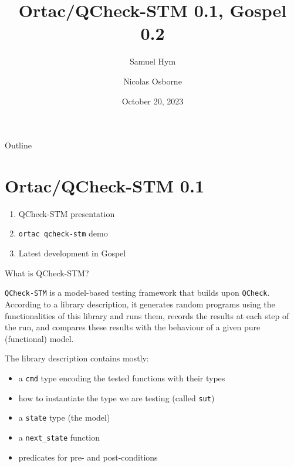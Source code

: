 \documentclass[pdf]{beamer}
\title{Ortac/QCheck-STM 0.1, Gospel 0.2}
\author{
  Samuel Hym
  \and
  Nicolas Osborne
}
\date{October 20, 2023}
\begin{document}
\begin{frame}
  \titlepage
\end{frame}

\begin{frame}{Outline}
    \tableofcontents[hideallsubsections]
\end{frame}


\section{Ortac/QCheck-STM 0.1}

\begin{frame}

  \begin{enumerate}
    \item QCheck-STM presentation
    \item \texttt{ortac qcheck-stm} demo
    \item Latest development in Gospel
  \end{enumerate}

\end{frame}

\begin{frame}{What is QCheck-STM?}

  \texttt{QCheck-STM} is a model-based testing framework that builds upon
  \texttt{QCheck}. According to a library description, it generates random
  programs using the functionalities of this library and runs them, records
  the results at each step of the run, and compares these results with the
  behaviour of a given pure (functional) model.

\end{frame}

\begin{frame}

  The library description contains mostly:

  \begin{itemize}

    \item a \texttt{cmd} type encoding the tested functions with their types
    \item how to instantiate the type we are testing (called \texttt{sut})
    \item a \texttt{state} type (the model)
    \item a \texttt{next\_state} function
    \item predicates for pre- and post-conditions

  \end{itemize}

\end{frame}
\end{document}
